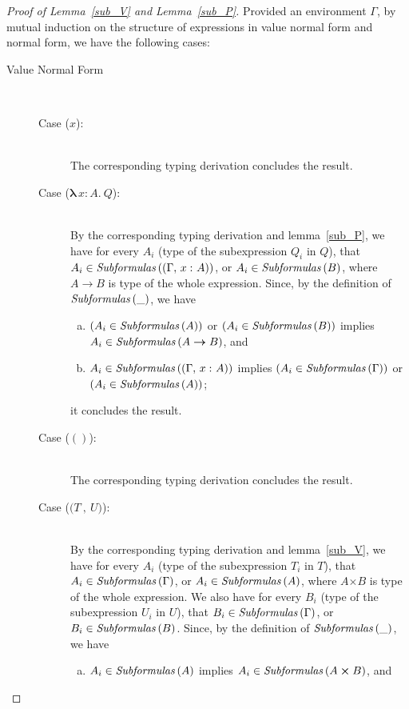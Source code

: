 \documentclass[a4paper]{article}
\newcommand{\typecolor}{}
\newcommand{\termcolor}{}
\newcommand{\tp}[1]{{\typecolor #1}}
\newcommand{\tm}[1]{{\termcolor #1}}
\newcommand{\typarr}[2]{#1\boldsymbol{\rightarrow}#2}
\newcommand{\typprd}[2]{#1\boldsymbol{\times}#2}
\newcommand{\expvar}[1]{#1}
\newcommand{\expunt}{\boldsymbol{()}}
\newcommand{\expabs}[3]{\boldsymbol{\lambda}\,#1\boldsymbol{\colon}#2\boldsymbol{.}\ #3}
\newcommand{\expprd}[2]{\boldsymbol{(}#1\ \boldsymbol{,}\ #2\boldsymbol{)}}
\newcommand{\typing}[2]{\tm{#1:\ }\tp{#2}}
\newcommand{\typenvcon}[2]{\tp{\Gamma,}\ \typing{#1}{#2}}
\newcommand{\txt}[1]{\text{\textit{#1}}}
\newcommand{\subformulas}[1]{\txt{Subformulas}\,(#1)}
\begin{document}
\begin{proof}[Proof of Lemma~\ref{sub_V} and Lemma~\ref{sub_P}]
Provided an environment $\Gamma$, by mutual induction on the structure
of expressions in value normal form and normal form, we have the
following cases:

\begin{description}

\item[Value Normal Form]\ \\
\begin{description}
\item[Case ($\expvar{x}$):]\ \\ 
  The corresponding typing derivation concludes the result. 
\item[Case ($\expabs{x}{A}{Q}$):]\ \\ 
  By the corresponding typing derivation and lemma~\ref{sub_P}, we
  have for every $A_i$ (type of the subexpression $Q_i$ in $Q$), that
  $A_i \in \subformulas{(\typenvcon{x}{A})}$, or $A_i \in
  \subformulas{B}$, where $\typarr{A}{B}$ is type of the whole
  expression. Since, by the definition of $\subformulas{\_}$, we have
  \begin{enumerate}[(a)] 
     \item $(A_i \in \subformulas{A})$ or $(A_i \in \subformulas{B})$ implies $A_i \in \subformulas{\typarr{A}{B}}$, and
     \item $A_i \in \subformulas{(\typenvcon{x}{A})}$ implies $(A_i \in \subformulas{\Gamma})$ or $(A_i \in \subformulas{A})$;
  \end{enumerate}
  it concludes the result.
\item[Case ($\expunt$):]\ \\ 
  The corresponding typing derivation concludes the result. 
\item[Case ($\expprd{T}{U}$):]\ \\ 
  By the corresponding typing derivation and lemma~\ref{sub_V}, we
  have for every $A_i$ (type of the subexpression $T_i$ in $T$), that
  $A_i \in \subformulas{\Gamma}$, or $A_i \in \subformulas{A}$, where
  $\typprd{A}{B}$ is type of the whole expression. We also have for
  every $B_i$ (type of the subexpression $U_i$ in $U$), that $B_i \in
  \subformulas{\Gamma}$, or $B_i \in \subformulas{B}$. Since, by the
  definition of $\subformulas{\_}$, we have
  \begin{enumerate}[(a)] 
     \item $A_i \in \subformulas{A}$ implies $A_i \in \subformulas{\typprd{A}{B}}$, and

\end{enumerate}
\end{description}
\end{description}
\end{proof}
\end{document}
